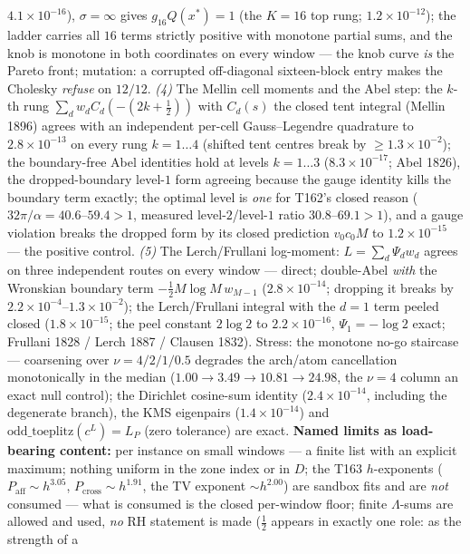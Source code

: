 $4.1\times10^{-16}$), $\sigma=\infty$ gives $g_{16}Q(x^*)=1$ (the
$K=16$ top rung; $1.2\times10^{-12}$); the ladder carries all $16$
terms strictly positive with monotone partial sums, and the knob is
monotone in both coordinates on every window --- the knob curve
\emph{is} the Pareto front; mutation: a corrupted off-diagonal
sixteen-block entry makes the Cholesky \emph{refuse} on $12/12$.
\emph{(4)} The Mellin cell moments and the Abel step: the $k$-th rung
$\sum_dw_dC_d(-(2k+\tfrac12))$ with $C_d(s)$ the closed tent integral
(Mellin 1896) agrees with an independent per-cell Gauss--Legendre
quadrature to $2.8\times10^{-13}$ on every rung $k=1\ldots4$ (shifted
tent centres break by $\ge1.3\times10^{-2}$); the boundary-free Abel
identities hold at levels $k=1\ldots3$ ($8.3\times10^{-17}$; Abel
1826), the dropped-boundary level-$1$ form agreeing because the gauge
identity kills the boundary term exactly; the optimal level is
\emph{one} for T162's closed reason ($32\pi/\alpha=40.6$--$59.4>1$,
measured level-$2$/level-$1$ ratio $30.8$--$69.1>1$), and a gauge
violation breaks the dropped form by its closed prediction $v_0c_0M$
to $1.2\times10^{-15}$ --- the positive control. \emph{(5)} The
Lerch/Frullani log-moment: $L=\sum_d\Psi_dw_d$ agrees on three
independent routes on every window --- direct; double-Abel \emph{with}
the Wronskian boundary term $-\tfrac12M\log M\,w_{M-1}$
($2.8\times10^{-14}$; dropping it breaks by
$2.2\times10^{-4}$--$1.3\times10^{-2}$); the Lerch/Frullani integral
with the $d=1$ term peeled closed ($1.8\times10^{-15}$; the peel
constant $2\log2$ to $2.2\times10^{-16}$, $\Psi_1=-\log2$ exact;
Frullani 1828 / Lerch 1887 / Clausen 1832). Stress: the monotone no-go
staircase --- coarsening over $\nu=4/2/1/0.5$ degrades the arch/atom
cancellation monotonically in the median
($1.00\to3.49\to10.81\to24.98$, the $\nu=4$ column an exact null
control); the Dirichlet cosine-sum identity ($2.4\times10^{-14}$,
including the degenerate branch), the KMS eigenpairs
($1.4\times10^{-14}$) and $\mathrm{odd\_toeplitz}(c^L)=L_P$ (zero
tolerance) are exact.
\textbf{Named limits as load-bearing content:} per instance on small
windows --- a finite list with an explicit maximum; nothing uniform in
the zone index or in $D$; the T163 $h$-exponents
($P_{\mathrm{aff}}\sim h^{3.05}$, $P_{\mathrm{cross}}\sim h^{1.91}$,
the TV exponent $\sim h^{2.00}$) are sandbox fits and are \emph{not}
consumed --- what is consumed is the closed per-window floor; finite
$\Lambda$-sums are allowed and used, \emph{no} RH statement is made
($\tfrac12$ appears in exactly one role: as the strength of a

